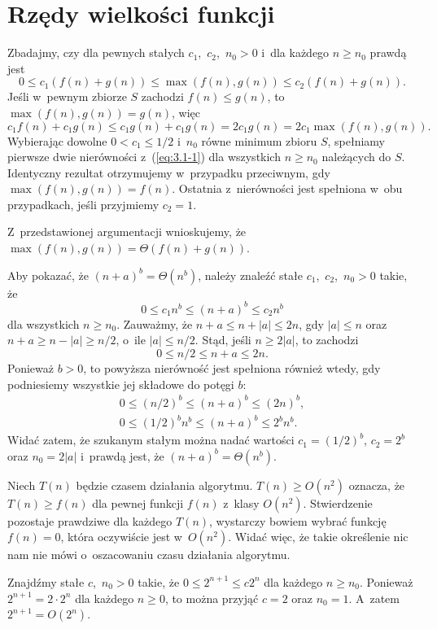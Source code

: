 \chapter{Rzędy wielkości funkcji}


\exercise{} %
Zbadajmy, czy dla pewnych stałych $c_1$,~$c_2$,~$n_0>0$ i~dla każdego $n\ge n_0$ prawdą jest
\begin{equation}
	0 \le c_1(f(n)+g(n)) \le \max(f(n),g(n)) \le c_2(f(n)+g(n)). \label{eq:3.1-1}
\end{equation}
Jeśli w~pewnym zbiorze $S$ zachodzi $f(n)\le g(n)$, to $\max(f(n),g(n))=g(n)$, więc
\[
	c_1f(n)+c_1g(n) \le c_1g(n)+c_1g(n) = 2c_1g(n) = 2c_1\max(f(n), g(n)).
\]
Wybierając dowolne $0<c_1\le1/2$ i~$n_0$ równe minimum zbioru $S$, spełniamy pierwsze dwie nierówności z~(\ref{eq:3.1-1}) dla wszystkich $n\ge n_0$ należących do $S$. Identyczny rezultat otrzymujemy w~przypadku przeciwnym, gdy $\max(f(n),g(n))=f(n)$. Ostatnia z~nierówności jest spełniona w~obu przypadkach, jeśli przyjmiemy $c_2=1$.

Z~przedstawionej argumentacji wnioskujemy, że $\max(f(n),g(n))=\Theta(f(n)+g(n))$.

\exercise{} %
Aby pokazać, że $(n+a)^b=\Theta(n^b)$, należy znaleźć stałe $c_1$,~$c_2$,~$n_0>0$ takie, że
\[
	0 \le c_1n^b \le (n+a)^b \le c_2n^b
\]
dla wszystkich $n\ge n_0$. Zauważmy, że $n+a\le n+|a|\le2n$, gdy $|a|\le n$ oraz $n+a\ge n-|a|\ge n/2$, o~ile $|a|\le n/2$. Stąd, jeśli $n\ge 2|a|$, to zachodzi
\[
	0 \le n/2 \le n+a \le 2n.
\]
Ponieważ $b>0$, to powyższa nierówność jest spełniona również wtedy, gdy podniesiemy wszystkie jej składowe do potęgi $b$:
\begin{gather*}
	0 \le (n/2)^b \le (n+a)^b \le (2n)^b, \\
	0 \le (1/2)^bn^b \le (n+a)^b \le 2^bn^b.
\end{gather*}
Widać zatem, że szukanym stałym można nadać wartości $c_1=(1/2)^b$, $c_2=2^b$ oraz $n_0=2|a|$ i~prawdą jest, że $(n+a)^b=\Theta(n^b)$.

\exercise{} %
Niech $T(n)$ będzie czasem działania algorytmu. $T(n)\ge O(n^2)$ oznacza, że $T(n)\ge f(n)$ dla pewnej funkcji $f(n)$ z~klasy $O(n^2)$. Stwierdzenie pozostaje prawdziwe dla każdego $T(n)$, wystarczy bowiem wybrać funkcję $f(n)=0$, która oczywiście jest w~$O(n^2)$. Widać więc, że takie określenie nic nam nie mówi o~oszacowaniu czasu działania algorytmu.

\exercise{} %
Znajdźmy stałe $c$,~$n_0>0$ takie, że $0\le2^{n+1}\le c2^n$ dla każdego $n\ge n_0$. Ponieważ $2^{n+1}=2\cdot2^n$ dla każdego $n\ge0$, to można przyjąć $c=2$ oraz $n_0=1$. A~zatem $2^{n+1}=O(2^n)$.

